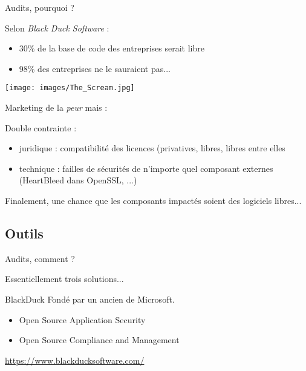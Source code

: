 \documentclass{beamer}
\begin{document}
\begin{frame}{Audits, pourquoi ?}

Selon \textit{Black Duck Software} :
\begin{itemize}
\item 30\% de la base de code des entreprises serait libre
\item 98\% des entreprises ne le sauraient pas...

\end{itemize}
\begin{minipage}[c]{0.4\linewidth}
\texttt{[image: images/The\_Scream.jpg]}\end{minipage}
\begin{minipage}[c]{0.5\linewidth}
Marketing de la \textit{peur} mais :

Double contrainte :
\begin{itemize}
\item juridique : compatibilité des licences (privatives, libres, libres entre elles
\item technique : failles de sécurités de n'importe quel composant externes (HeartBleed dans OpenSSL, ...)
\end{itemize}
\end{minipage}
Finalement, une chance que les composants impactés soient des logiciels libres...
  
\end{frame}

\subsection{Outils}

\begin{frame}{Audits, comment ?}

Essentiellement trois solutions...

\end{frame}


\begin{frame}{BlackDuck}
  Fondé par un ancien de Microsoft.

  \begin{itemize}
  \item Open Source Application Security
  \item Open Source Compliance and Management
  \end{itemize}

\url{https://www.blackducksoftware.com/}
\end{frame}
\end{document}
